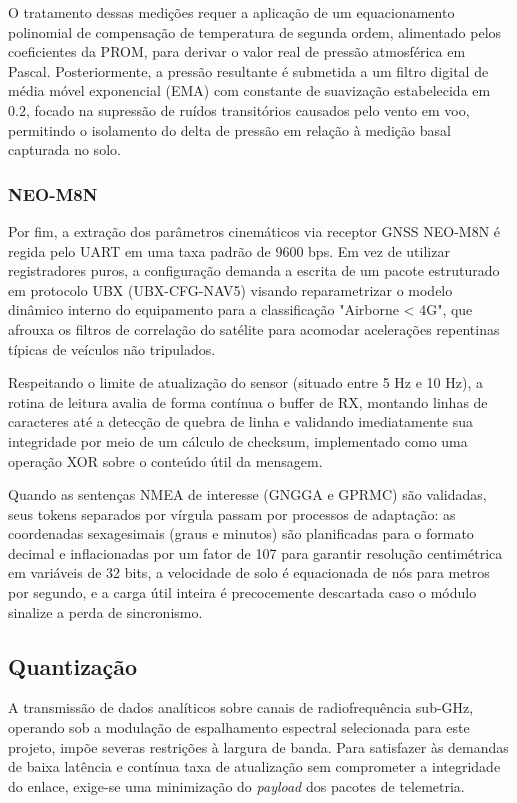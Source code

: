 O tratamento dessas medições requer a aplicação de um equacionamento polinomial de compensação de temperatura de segunda ordem, alimentado pelos coeficientes da PROM, para derivar o valor real de pressão atmosférica em Pascal. Posteriormente, a pressão resultante é submetida a um filtro digital de média móvel exponencial (EMA) com constante de suavização estabelecida em $0.2$, focado na supressão de ruídos transitórios causados pelo vento em voo, permitindo o isolamento do delta de pressão em relação à medição basal capturada no solo.

\subsubsection{NEO-M8N}
Por fim, a extração dos parâmetros cinemáticos via receptor GNSS NEO-M8N é regida pelo UART em uma taxa padrão de 9600 bps. Em vez de utilizar registradores puros, a configuração demanda a escrita de um pacote estruturado em protocolo UBX (UBX-CFG-NAV5) visando reparametrizar o modelo dinâmico interno do equipamento para a classificação "Airborne < 4G", que afrouxa os filtros de correlação do satélite para acomodar acelerações repentinas típicas de veículos não tripulados. 

Respeitando o limite de atualização do sensor (situado entre 5 Hz e 10 Hz), a rotina de leitura avalia de forma contínua o buffer de RX, montando linhas de caracteres até a detecção de quebra de linha e validando imediatamente sua integridade por meio de um cálculo de checksum, implementado como uma operação XOR sobre o conteúdo útil da mensagem. 

Quando as sentenças NMEA de interesse (GNGGA e GPRMC) são validadas, seus tokens separados por vírgula passam por processos de adaptação: as coordenadas sexagesimais (graus e minutos) são planificadas para o formato decimal e inflacionadas por um fator de 107 para garantir resolução centimétrica em variáveis de 32 bits, a velocidade de solo é equacionada de nós para metros por segundo, e a carga útil inteira é precocemente descartada caso o módulo sinalize a perda de sincronismo.

\subsection{Quantização}
A transmissão de dados analíticos sobre canais de radiofrequência sub-GHz, operando sob a modulação de espalhamento espectral selecionada para este projeto, impõe severas restrições à largura de banda. Para satisfazer às demandas de baixa latência e contínua taxa de atualização sem comprometer a integridade do enlace, exige-se uma minimização do \textit{payload} dos pacotes de telemetria. 

